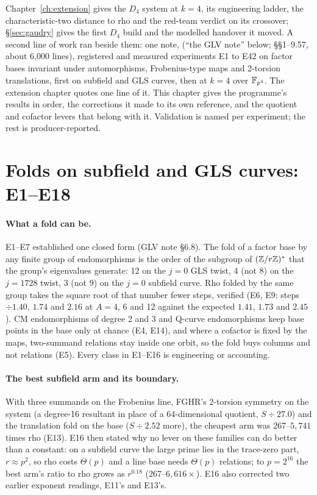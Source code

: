 Chapter~\ref{ch:extension} gives the $D_4$ system at $k=4$, its engineering
ladder, the characteristic-two distance to rho and the red-team verdict on
its crossover; \S\ref{sec:gaudry} gives the first $D_4$ build and the
modelled handover it moved. A second line of work ran beside them: one
note, 
(``the GLV note'' below; \S\S1--9.57, about 6{,}000 lines), registered and
measured experiments E1 to E42 on factor bases invariant under
automorphisms, Frobenius-type maps and 2-torsion translations, first on
subfield and GLS curves, then at $k=4$ over $\mathbb{F}_{p^4}$. The extension
chapter quotes one line of it. This chapter gives the programme's results
in order, the corrections it made to its own reference, and the quotient
and cofactor levers that belong with it. Validation is named per
experiment; the rest is producer-reported.

\section{Folds on subfield and GLS curves: E1--E18}\label{sec:glv-folds}

\paragraph{What a fold can be.} E1--E7 established one closed form
(GLV note \S6.8). The fold of a factor base by any finite group of
endomorphisms is the order of the subgroup of $(\mathbb{Z}/r\mathbb{Z})^*$ that the group's
eigenvalues generate: 12 on the $j=0$ GLS twist, 4 (not 8) on the $j=1728$
twist, 3 (not 9) on the $j=0$ subfield curve. Rho folded by the same group
takes the square root of that number fewer steps, verified (E6, E9: steps
$\div1.40$, $1.74$ and $2.16$ at $A=4$, 6 and 12 against the expected $1.41$,
$1.73$ and $2.45$). CM endomorphisms of degree 2 and 3 and Q-curve
endomorphisms keep base points in the base only at chance (E4, E14), and
where a cofactor is fixed by the maps, two-summand relations stay inside one
orbit, so the fold buys columns and not relations (E5). Every class in
E1--E16 is engineering or accounting.

\paragraph{The best subfield arm and its boundary.} With three summands on
the Frobenius line, FGHR's 2-torsion symmetry on the system (a degree-16
resultant in place of a 64-dimensional quotient, $S\div27.0$) and the
translation fold on the base ($S\div2.52$ more), the cheapest arm was
$267$--$5{,}741$ times rho (E13). E16 then stated why no lever on these
families can do better than a constant: on a subfield curve the large prime
lies in the trace-zero part, $r\approx p^2$, so rho costs $\Theta(p)$ and a
line base needs $\Theta(p)$ relations; to $p=2^{16}$ the best arm's ratio to
rho grows as $r^{0.18}$ ($267$--$6{,}616\times$). E16 also corrected two
earlier exponent readings, E11's and E13's.

